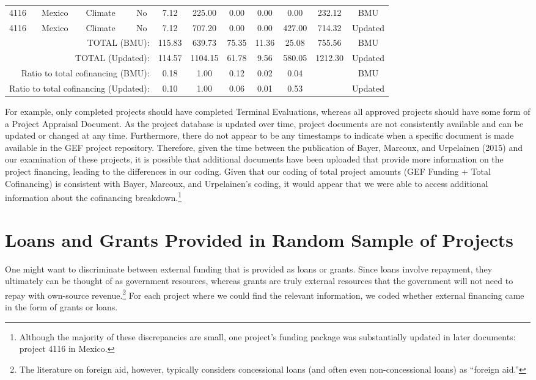 \documentclass{article}
\begin{document}
\begin{singlespace}
\begin{table}[H]
{\begin{tabular}{lllcccccccc}
			4116 & Mexico & Climate & No & 7.12 & 225.00 & 0.00 & 0.00 & 0.00 & 232.12 & BMU \\
			\rowcolor[HTML]{EFEFEF} 
			4116 & Mexico & Climate & No & 7.12 & 707.20 & 0.00 & 0.00 & 427.00 & 714.32 & Updated \\ \hline
			\multicolumn{4}{r}{TOTAL (BMU):} & 115.83 & 639.73 & 75.35 & 11.36 & 25.08 & 755.56 & BMU \\
			\multicolumn{4}{r}{TOTAL (Updated):} & 114.57 & 1104.15 & 61.78 & 9.56 & 580.05 & 1212.30 & Updated \\ \hline
			\multicolumn{4}{r}{Ratio to total cofinancing (BMU):} & 0.18 & 1.00 & 0.12 & 0.02 & 0.04 &  & BMU \\
			\multicolumn{4}{r}{Ratio to total cofinancing (Updated):} & 0.10 & 1.00 & 0.06 & 0.01 & 0.53 &  & Updated \\ \hline
		\end{tabular}%
	}
\end{table}
\end{singlespace}

\newpage
For example, only completed projects should have completed Terminal Evaluations, whereas all approved projects should have some form of a Project Appraisal Document. As the project database is updated over time, project documents are not consistently available and can be updated or changed at any time. Furthermore, there do not appear to be any timestamps to indicate when a specific document is made available in the GEF project repository. Therefore, given the time between the publication of Bayer, Marcoux, and Urpelainen (2015) and our examination of these projects, it is possible that additional documents have been uploaded that provide more information on the project financing, leading to the differences in our coding. Given that our coding of total project amounts (GEF Funding + Total Cofinancing) is consistent with Bayer, Marcoux, and Urpelainen’s coding, it would appear that we were able to access additional information about the cofinancing breakdown.\footnote{Although the majority of these discrepancies are small, one project’s funding package was substantially updated in later documents: project 4116 in Mexico.}  

\section{Loans and Grants Provided in Random Sample of Projects}
One might want to discriminate between external funding that is provided as loans or grants.  Since loans involve repayment, they ultimately can be thought of as government resources, whereas grants are truly external resources that the government will not need to repay with own-source revenue.\footnote{The literature on foreign aid, however, typically considers concessional loans (and often even non-concessional loans) as “foreign aid.”}   For each project where we could find the relevant information, we coded whether external financing came in the form of grants or loans. 
\end{document}
